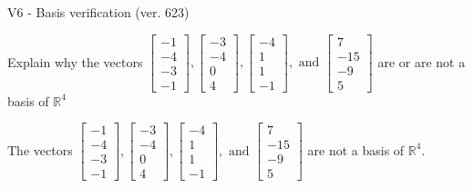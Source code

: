 \begin{exercise}
  \begin{exerciseTitle}V6 - Basis verification (ver. 623)\end{exerciseTitle}
  \begin{exerciseStatement}
    Explain why the vectors \(\left[\begin{array}{r}
-1 \\
-4 \\
-3 \\
-1
\end{array}\right] , \left[\begin{array}{r}
-3 \\
-4 \\
0 \\
4
\end{array}\right] , \left[\begin{array}{r}
-4 \\
1 \\
1 \\
-1
\end{array}\right] , \text{ and } \left[\begin{array}{r}
7 \\
-15 \\
-9 \\
5
\end{array}\right]\) are or are not a basis of \(\mathbb{R}^4\)	


  \end{exerciseStatement}
  \begin{exerciseAnswer}
   The vectors \(\left[\begin{array}{r}
-1 \\
-4 \\
-3 \\
-1
\end{array}\right] , \left[\begin{array}{r}
-3 \\
-4 \\
0 \\
4
\end{array}\right] , \left[\begin{array}{r}
-4 \\
1 \\
1 \\
-1
\end{array}\right] , \text{ and } \left[\begin{array}{r}
7 \\
-15 \\
-9 \\
5
\end{array}\right]\) 
  	 are not  a basis of \(\mathbb{R}^4\).
  


  \end{exerciseAnswer}
\end{exercise}